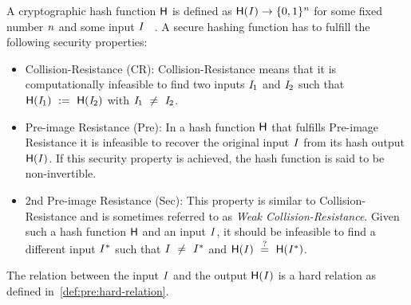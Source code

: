 \begin{definition}\label{def:pre:hash-function}
    A cryptographic hash function $\mathsf{H}$ is defined as $\mathsf{H} (\mathit{I}) \rightarrow \{0,1\}^{\mathit{n}}$ for some fixed number $\mathit{n}$ and some input $\mathit{I}$ ~\cite{al2011cryptographic}.
    A secure hashing function has to fulfill the following security properties:
    \begin{itemize}
        \item Collision-Resistance (CR): Collision-Resistance means that it is computationally infeasible to find two inputs $\mathit{I}_1$ and $\mathit{I}_2$ such that
        $\mathsf{H} (\mathit{I}_1) ~:=~ \mathsf{H} (\mathit{I}_2)$ with $\mathit{I}_1 ~\neq~ \mathit{I}_2$.
        \item Pre-image Resistance (Pre): In a hash function $\mathsf{H}$ that fulfills Pre-image Resistance it is infeasible to recover the original input $\mathit{I}$ from its hash output $\mathsf{H} (\mathit{I})$.
        If this security property is achieved, the hash function is said to be non-invertible.
        \item 2nd Pre-image Resistance (Sec):  This property is similar to Collision-Resistance and is sometimes referred to as \textit{Weak Collision-Resistance}.
        Given such a hash function $\mathsf{H}$ and an input $\mathit{I}$, it should be infeasible to find a different input $\mathit{I}^*$ such that $\mathit{I} ~\neq~ \mathit{I}^*$
        and $\mathsf{H} (\mathit{I}) ~\stackrel{?}{=}~ \mathsf{H} (\mathit{I}^*)$.
    \end{itemize}
    The relation between the input $\mathit{I}$ and the output $\mathsf{H} (\mathit{I})$ is a hard relation as defined in~\ref{def:pre:hard-relation}.
\end{definition}

